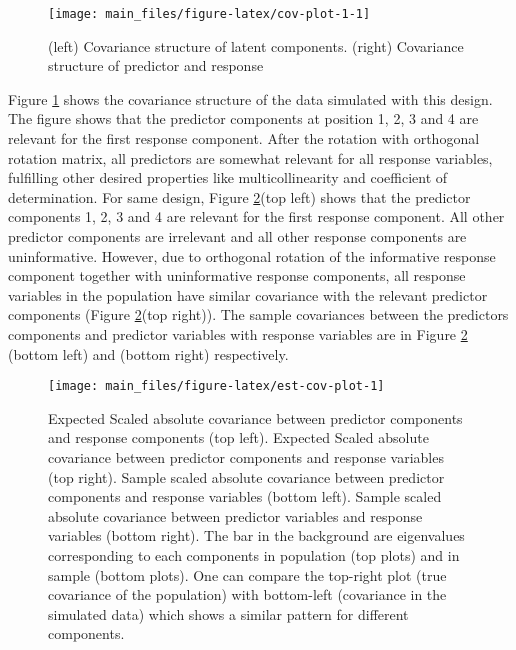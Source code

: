 \documentclass[12pt,3p,authoryear]{elsarticle}
\begin{document}
\begin{figure}
\texttt{[image: main\_files/figure-latex/cov-plot-1-1]} \caption{(left) Covariance structure of latent components. (right) Covariance structure of predictor and response}\label{fig:cov-plot-1}
\end{figure}

Figure \ref{fig:cov-plot-1} shows the covariance structure of the data
simulated with this design. The figure shows that the predictor
components at position 1, 2, 3 and 4 are relevant for the first response
component. After the rotation with orthogonal rotation matrix, all
predictors are somewhat relevant for all response variables, fulfilling
other desired properties like multicollinearity and coefficient of
determination. For same design, Figure \ref{fig:est-cov-plot}(top left)
shows that the predictor components 1, 2, 3 and 4 are relevant for the
first response component. All other predictor components are irrelevant
and all other response components are uninformative. However, due to
orthogonal rotation of the informative response component together with
uninformative response components, all response variables in the
population have similar covariance with the relevant predictor
components (Figure \ref{fig:est-cov-plot}(top right)). The sample
covariances between the predictors components and predictor variables
with response variables are in Figure \ref{fig:est-cov-plot} (bottom
left) and (bottom right) respectively.













\begin{figure}
\texttt{[image: main\_files/figure-latex/est-cov-plot-1]} \caption{Expected Scaled absolute covariance between predictor
components and response components (top left). Expected Scaled absolute
covariance between predictor components and response variables (top
right). Sample scaled absolute covariance between predictor components
and response variables (bottom left). Sample scaled absolute covariance
between predictor variables and response variables (bottom right). The
bar in the background are eigenvalues corresponding to each components
in population (top plots) and in sample (bottom plots). One can compare
the top-right plot (true covariance of the population) with bottom-left
(covariance in the simulated data) which shows a similar pattern for
different components.}\label{fig:est-cov-plot}
\end{figure}
\end{document}
